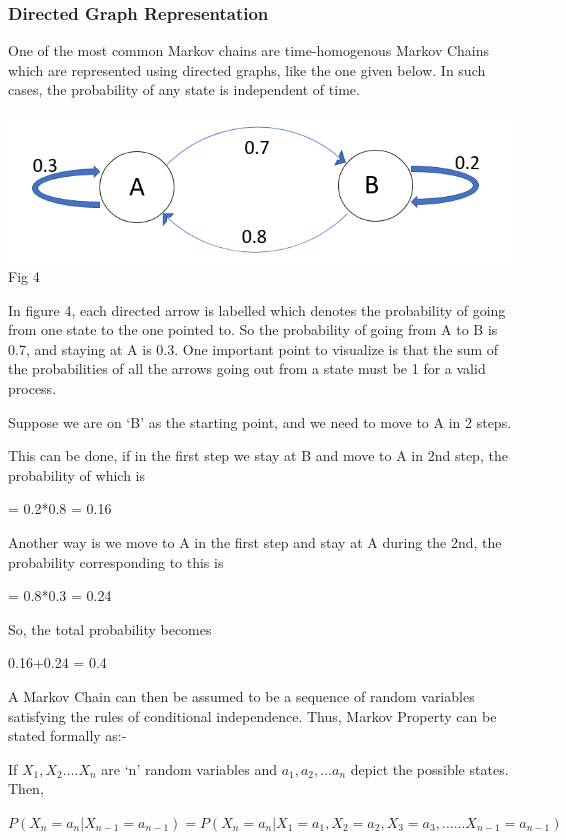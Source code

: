 \documentclass[10pt,twocolumn,letterpaper]{article}
\begin{document}
\subsubsection{Directed Graph Representation}
One of the most common Markov chains are time-homogenous Markov Chains which are represented using directed graphs, like the one given below. In such cases, the probability of any state is independent of time.  
\begin{center}
    \includegraphics[scale=0.35]{Markov_Chain.png}
    Fig 4
\end{center}

In figure 4, each directed arrow is labelled which denotes the probability of going from one state to the one pointed to. So the probability of going from A to B is 0.7, and staying at A is 0.3. One important point to visualize is that the sum of the probabilities of all the arrows going out from a state must be 1 for a valid process. 

Suppose we are on ‘B’ as the starting point, and we need to move to A in 2 steps. 

This can be done, if in the first step we stay at B and move to A in 2nd step, the probability of which is 
\begin{center}
     = 0.2*0.8 = 0.16 
\end{center}

Another way is we move to A in the first step and stay at A during the 2nd, the probability corresponding to this is 
\begin{center}
    = 0.8*0.3 = 0.24
\end{center}
So, the total probability becomes 
\begin{center}
    0.16+0.24 = 0.4
\end{center}

A Markov Chain can then be assumed to be a sequence of random variables satisfying the rules of conditional independence. Thus, Markov Property can be stated formally as:- 

If $X_1, X_2 …. X_n$ are ‘n’ random variables and $a_1, a_2,... a_n$ depict the possible states. Then,
\begin{center}
    $P(X_n = a_n | X_{n-1} = a_{n-1}) = P(X_n = a_n | X_1 = a_1, X_2 = a_2, X_3 = a_3, …... X_{n-1} = a_{n-1}) $
\end{center}
\end{document}
